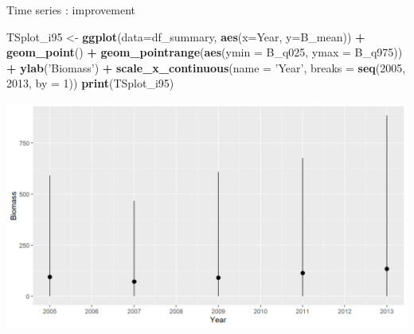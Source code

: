 \documentclass[
  ignorenonframetext,
]{beamer}
\newenvironment{Shaded}{\begin{snugshade}}{\end{snugshade}}
\newcommand{\DataTypeTok}[1]{\textcolor[rgb]{0.13,0.29,0.53}{#1}}
\newcommand{\DecValTok}[1]{\textcolor[rgb]{0.00,0.00,0.81}{#1}}
\newcommand{\KeywordTok}[1]{\textcolor[rgb]{0.13,0.29,0.53}{\textbf{#1}}}
\newcommand{\NormalTok}[1]{#1}
\newcommand{\OperatorTok}[1]{\textcolor[rgb]{0.81,0.36,0.00}{\textbf{#1}}}
\newcommand{\StringTok}[1]{\textcolor[rgb]{0.31,0.60,0.02}{#1}}
\begin{document}
\begin{frame}[fragile]{Time series : improvement}
\protect\hypertarget{time-series-improvement}{}

\begin{Shaded}
\begin{Highlighting}[]
\NormalTok{TSplot_i95 <-}\StringTok{ }\KeywordTok{ggplot}\NormalTok{(}\DataTypeTok{data=}\NormalTok{df_summary, }\KeywordTok{aes}\NormalTok{(}\DataTypeTok{x=}\NormalTok{Year, }\DataTypeTok{y=}\NormalTok{B_mean)) }\OperatorTok{+}\StringTok{ }
\StringTok{  }\KeywordTok{geom_point}\NormalTok{() }\OperatorTok{+}\StringTok{ }\KeywordTok{geom_pointrange}\NormalTok{(}\KeywordTok{aes}\NormalTok{(}\DataTypeTok{ymin =}\NormalTok{ B_q025, }\DataTypeTok{ymax =}\NormalTok{ B_q975)) }\OperatorTok{+}
\StringTok{  }\KeywordTok{ylab}\NormalTok{(}\StringTok{'Biomass'}\NormalTok{) }\OperatorTok{+}
\StringTok{  }\KeywordTok{scale_x_continuous}\NormalTok{(}\DataTypeTok{name =} \StringTok{'Year'}\NormalTok{, }\DataTypeTok{breaks =} \KeywordTok{seq}\NormalTok{(}\DecValTok{2005}\NormalTok{, }\DecValTok{2013}\NormalTok{, }\DataTypeTok{by =} \DecValTok{1}\NormalTok{))}
\KeywordTok{print}\NormalTok{(TSplot_i95)}
\end{Highlighting}
\end{Shaded}

\begin{center}\includegraphics[width=0.8\linewidth]{figure/sp_TSplot_i95_imp-1} \end{center}

\end{frame}
\end{document}
